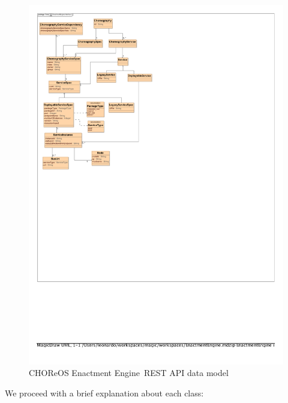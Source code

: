 \documentclass[a4paper, 10pt]{article}
\newcommand{\ee}{CHOReOS Enactment Engine}
\begin{document}
\begin{figure}
\centering
\includegraphics[scale=1.6]{img/data_model.pdf}
\caption{\ee\ REST API data model}
\label{img:data_model}
\end{figure}

We proceed with a brief explanation about each class:
\end{document}
